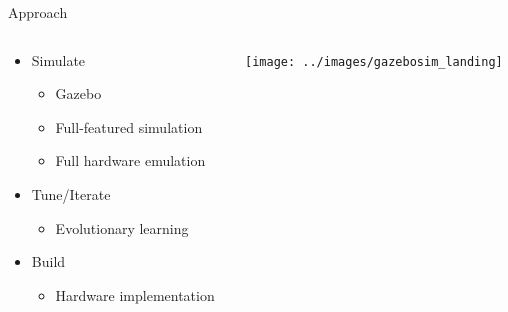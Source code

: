 \documentclass[]{beamer}
\begin{document}
\begin{frame}{Approach}
    \begin{columns}
        \begin{column}{0.4\textwidth}
            \begin{itemize}
                \item Simulate
                    \begin{itemize}
                        \item Gazebo
                        \item Full-featured simulation
                        \item Full hardware emulation
                    \end{itemize}
                \item Tune/Iterate
                    \begin{itemize}
                        \item Evolutionary learning
                    \end{itemize}
                \item Build
                    \begin{itemize}
                        \item Hardware implementation
                    \end{itemize}
            \end{itemize}
        \end{column}
        \begin{column}{0.55\textwidth}
            \texttt{[image: ../images/gazebosim\_landing]}
        \end{column}
    \end{columns}
\end{frame}
\end{document}
